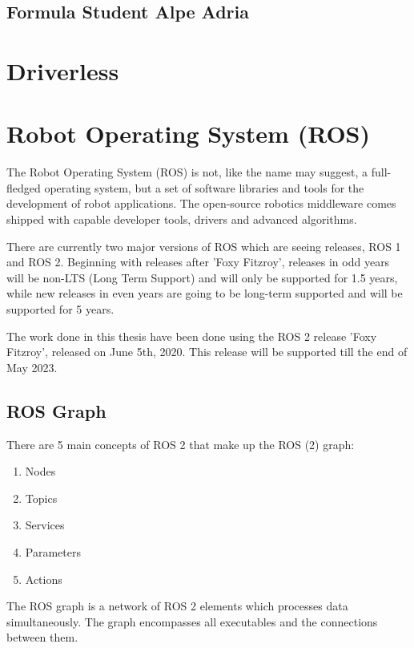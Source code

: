 \subsection{Formula Student Alpe Adria}

\section{Driverless}
\lipsum[1]

\section{Robot Operating System (ROS)}
The Robot Operating System (ROS) is not, like the name may suggest, a full-fledged operating system, but a set of software libraries and tools for the development of robot applications. The open-source robotics middleware comes shipped with capable developer tools, drivers and advanced algorithms. \cite{ros2_documentation}

There are currently two major versions of ROS which are seeing releases, ROS 1 and ROS 2. \cite{ros2_distributions} Beginning with releases after 'Foxy Fitzroy', releases in odd years will be non-LTS (Long Term Support) and will only be supported for 1.5 years, while new releases in even years are going to be long-term supported and will be supported for 5 years. \cite{ros2_releases_and_target_platforms}

The work done in this thesis have been done using the ROS 2 release 'Foxy Fitzroy', released on June 5th, 2020. This release will be supported till the end of May 2023. \cite{ros2_distributions}

\subsection{ROS Graph}
There are 5 main concepts of ROS 2 that make up the ROS (2) graph:
\begin{enumerate}
    \item Nodes
    \item Topics
    \item Services
    \item Parameters
    \item Actions
\end{enumerate}

The ROS graph is a network of ROS 2 elements which processes data simultaneously. The graph encompasses all executables and the connections between them.

